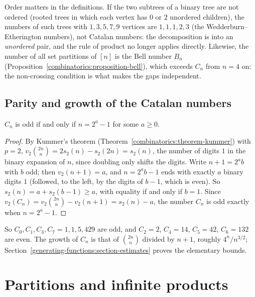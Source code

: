 \begin{counterexample}\label{generating-functions:counterexample-catalan-order}
Order matters in the definitions. If the two subtrees of a binary tree are not ordered (rooted trees in which each vertex has $0$ or $2$ unordered children), the numbers of such trees with
$1, 3, 5, 7, 9$ vertices are $1, 1, 1, 2, 3$ (the Wedderburn--Etherington numbers), not Catalan numbers: the decomposition is into an \emph{unordered} pair, and the rule of product no longer applies
directly. Likewise, the number of all set partitions of $[n]$ is the Bell number $B_n$ (Proposition~\ref{combinatorics:proposition-bell}), which exceeds $C_n$ from $n = 4$ on: the non-crossing condition
is what makes the gaps independent.
\end{counterexample}

\subsection{Parity and growth of the Catalan numbers}\label{generating-functions:subsection-catalan-arithmetic}

\begin{proposition}\label{generating-functions:proposition-catalan-parity}
$C_n$ is odd if and only if $n = 2^a - 1$ for some $a \geq 0$.
\end{proposition}

\begin{proof}
By Kummer's theorem (Theorem~\ref{combinatorics:theorem-kummer}) with $p = 2$, $v_2\binom{2n}{n} = 2s_2(n) - s_2(2n) = s_2(n)$, the number of digits $1$ in the binary expansion of $n$, since doubling
only shifts the digits. Write $n + 1 = 2^ab$ with $b$ odd; then $v_2(n + 1) = a$, and $n = 2^ab - 1$ ends with exactly $a$ binary digits $1$ (followed, to the left, by the digits of $b - 1$, which is even).
So $s_2(n) = a + s_2(b - 1) \geq a$, with equality if and only if $b = 1$. Since $v_2(C_n) = v_2\binom{2n}{n} - v_2(n + 1) = s_2(n) - a$, the number $C_n$ is odd exactly when $n = 2^a - 1$.
\end{proof}

So $C_0, C_1, C_3, C_7 = 1, 1, 5, 429$ are odd, and $C_2 = 2$, $C_4 = 14$, $C_5 = 42$, $C_6 = 132$ are even. The growth of $C_n$ is that of $\binom{2n}{n}$ divided by $n + 1$, roughly $4^n/n^{3/2}$;
Section~\ref{generating-functions:section-estimates} proves the elementary bounds.

\section{Partitions and infinite products}\label{generating-functions:section-partitions}


